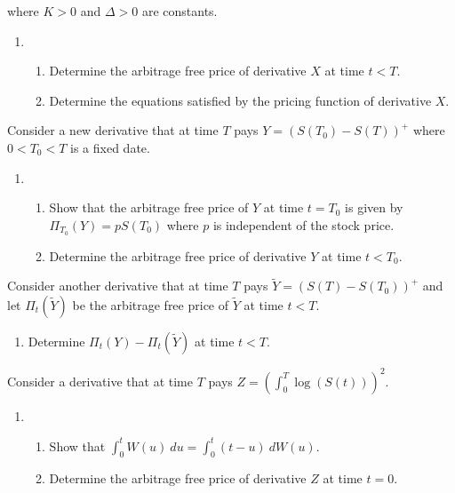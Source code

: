 \documentclass[a4paper,12pt,openany]{book}
\providecommand{\tightlist}{%
 \setlength{\itemsep}{0pt}\setlength{\parskip}{0pt}}
\begin{document}
where \(K>0\) and \(\Delta>0\) are constants.

\begin{enumerate}
\def\labelenumi{\alph{enumi}.}
\item
  \begin{enumerate}
  \def\labelenumii{\roman{enumii}.}
  \tightlist
  \item
    Determine the arbitrage free price of derivative \(X\) at time \(t<T\).
  \item
    Determine the equations satisfied by the pricing function of derivative \(X\).
  \end{enumerate}
\end{enumerate}

Consider a new derivative that at time \(T\) pays \(Y=\left(S(T_0)-S(T)\right)^+\) where \(0<T_0<T\) is a fixed date.

\begin{enumerate}
\def\labelenumi{\alph{enumi}.}
\setcounter{enumi}{1}
\item
  \begin{enumerate}
  \def\labelenumii{\roman{enumii}.}
  \tightlist
  \item
    Show that the arbitrage free price of \(Y\) at time \(t=T_0\) is given by \(\Pi_{T_0}(Y)=pS(T_0)\) where \(p\) is independent of the stock price.
  \item
    Determine the arbitrage free price of derivative \(Y\) at time \(t<T_0\).
  \end{enumerate}
\end{enumerate}

Consider another derivative that at time \(T\) pays \(\tilde{Y}=\left(S(T)-S(T_0)\right)^+\) and let \(\Pi_t(\tilde{Y})\) be the arbitrage free price of \(\tilde{Y}\) at time \(t<T\).

\begin{enumerate}
\def\labelenumi{\alph{enumi}.}
\setcounter{enumi}{2}
\tightlist
\item
  Determine \(\Pi_t(Y)-\Pi_t(\tilde{Y})\) at time \(t<T\).
\end{enumerate}

Consider a derivative that at time \(T\) pays \(Z=\left(\int_0^T \log(S(t))\right)^2\).

\begin{enumerate}
\def\labelenumi{\alph{enumi}.}
\setcounter{enumi}{3}
\item
  \begin{enumerate}
  \def\labelenumii{\roman{enumii}.}
  \tightlist
  \item
    Show that \(\int_0^t W(u)\ du=\int_0^t(t-u)\ dW(u)\).
  \item
    Determine the arbitrage free price of derivative \(Z\) at time \(t=0\).
  \end{enumerate}
\end{enumerate}
\end{document}
